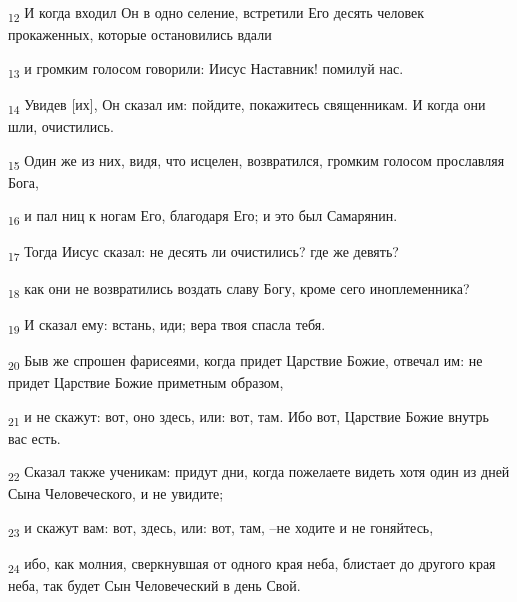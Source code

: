 \begin{tcolorbox}
\textsubscript{12} И когда входил Он в одно селение, встретили Его десять человек прокаженных, которые остановились вдали
\end{tcolorbox}
\begin{tcolorbox}
\textsubscript{13} и громким голосом говорили: Иисус Наставник! помилуй нас.
\end{tcolorbox}
\begin{tcolorbox}
\textsubscript{14} Увидев [их], Он сказал им: пойдите, покажитесь священникам. И когда они шли, очистились.
\end{tcolorbox}
\begin{tcolorbox}
\textsubscript{15} Один же из них, видя, что исцелен, возвратился, громким голосом прославляя Бога,
\end{tcolorbox}
\begin{tcolorbox}
\textsubscript{16} и пал ниц к ногам Его, благодаря Его; и это был Самарянин.
\end{tcolorbox}
\begin{tcolorbox}
\textsubscript{17} Тогда Иисус сказал: не десять ли очистились? где же девять?
\end{tcolorbox}
\begin{tcolorbox}
\textsubscript{18} как они не возвратились воздать славу Богу, кроме сего иноплеменника?
\end{tcolorbox}
\begin{tcolorbox}
\textsubscript{19} И сказал ему: встань, иди; вера твоя спасла тебя.
\end{tcolorbox}
\begin{tcolorbox}
\textsubscript{20} Быв же спрошен фарисеями, когда придет Царствие Божие, отвечал им: не придет Царствие Божие приметным образом,
\end{tcolorbox}
\begin{tcolorbox}
\textsubscript{21} и не скажут: вот, оно здесь, или: вот, там. Ибо вот, Царствие Божие внутрь вас есть.
\end{tcolorbox}
\begin{tcolorbox}
\textsubscript{22} Сказал также ученикам: придут дни, когда пожелаете видеть хотя один из дней Сына Человеческого, и не увидите;
\end{tcolorbox}
\begin{tcolorbox}
\textsubscript{23} и скажут вам: вот, здесь, или: вот, там, --не ходите и не гоняйтесь,
\end{tcolorbox}
\begin{tcolorbox}
\textsubscript{24} ибо, как молния, сверкнувшая от одного края неба, блистает до другого края неба, так будет Сын Человеческий в день Свой.
\end{tcolorbox}
